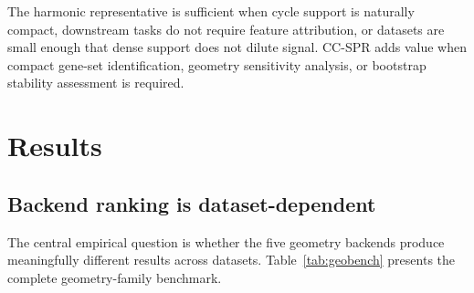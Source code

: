 \documentclass[12pt]{article}
\begin{document}
The harmonic representative is sufficient when cycle support is naturally compact, downstream tasks do not require feature attribution, or datasets are small enough that dense support does not dilute signal.
CC-SPR adds value when compact gene-set identification, geometry sensitivity analysis, or bootstrap stability assessment is required.

\section{Results}
\label{sec:results}

\subsection{Backend ranking is dataset-dependent}
\label{sec:benchmark}

The central empirical question is whether the five geometry backends produce meaningfully different results across datasets.
Table~\ref{tab:geobench} presents the complete geometry-family benchmark.
\end{document}
